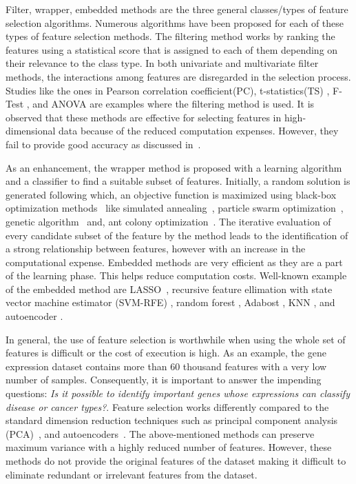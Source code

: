 \documentclass{bioinfo}
\begin{document}
Filter, wrapper, embedded methods are the three general classes/types of feature selection algorithms. 
Numerous algorithms have been proposed for each of these types of feature selection methods. 
The filtering method works by ranking the features using a statistical score that is assigned to each of them depending on their relevance to the class type. 
In both univariate and multivariate filter methods, the interactions among features are disregarded in the selection process. 
Studies like the ones in Pearson correlation coefficient(PC), t-statistics(TS) \citep{speed2003statistical}, F-Test \citep{ding2005minimum}, and ANOVA \citep{ding2015identification} are examples where the filtering method is used. 
It is observed that these methods are effective for selecting features in high-dimensional data because of the reduced computation expenses. 
However, they fail to provide good accuracy as discussed in~\citep{sun2018cross}.

 
As an enhancement, the wrapper method is proposed with a learning algorithm and a classifier to find a suitable subset of features. 
Initially, a random solution is generated following which, an objective function is maximized using black-box optimization methods~\citep{rau2019exploring} like simulated annealing~\citep{jeong2018feature}, particle swarm optimization~\citep{xue2012particle}, genetic algorithm~\citep{wu2011feature} and, ant colony optimization~\citep{kabir2012new}. 
The iterative evaluation of every candidate subset of the feature by the method leads to the identification of a strong relationship between features,  however with an increase in the computational expense. 
Embedded methods are very efficient as they are a part of the learning phase. 
This helps reduce computation costs. 
Well-known example of the embedded method are LASSO~\citep{tibshirani1996regression}, recursive feature ellimation with state vector machine estimator (SVM-RFE) \citep{abdullah2019, guyon2002gene, fang2019tightly}, random forest \citep{pouyan2018random, ram2017classification}, Adabost \citep{wang2012adaboost}, KNN \citep{le2019statistical}, and autoencoder \citep{lu2019autoencoder}.


In general, the use of feature selection is worthwhile when using the whole set of features is difficult or the cost of execution is high. 
As an example, the gene expression dataset contains more than 60 thousand features with a very low number of samples. 
Consequently, it is important to answer the impending questions: \textit{Is it possible to identify important genes whose expressions can classify disease or cancer types?}. 
Feature selection works differently compared to the standard dimension reduction techniques such as principal component analysis (PCA)~\citep{hotelling1933analysis}, and autoencoders~\citep{hinton2006reducing}. 
The above-mentioned methods can preserve maximum variance with a highly reduced number of features. 
However, these methods do not provide the original features of the dataset making it difficult to eliminate redundant or irrelevant features from the dataset. 
\end{document}
